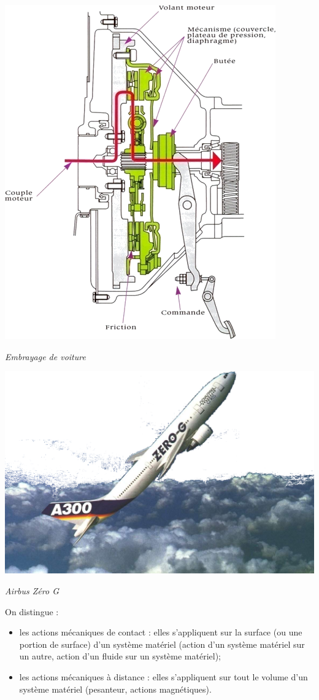 \documentclass[10pt]{article}
\begin{document}
\begin{exemple}

\begin{minipage}[c]{.47\linewidth}
\begin{center}
\includegraphics[width=.7\textwidth]{images/embrayage}

\textit{Embrayage de voiture}
\end{center}

\end{minipage}\hfill
\begin{minipage}[c]{.47\linewidth}
\begin{center}
\includegraphics[width=.7\textwidth]{images/zerog}

\textit{Airbus Zéro G \cite{zerog}}
\end{center}
\end{minipage}

On distingue :
\begin{itemize}
\item les actions mécaniques de contact : elles s'appliquent sur la surface (ou une portion de surface) d'un système matériel (action d'un système matériel sur un autre, action d'un fluide sur un système matériel);
\item les actions mécaniques à distance : elles s'appliquent sur tout le volume d'un système matériel (pesanteur, actions magnétiques).
\end{itemize}

\end{exemple}
\end{document}
